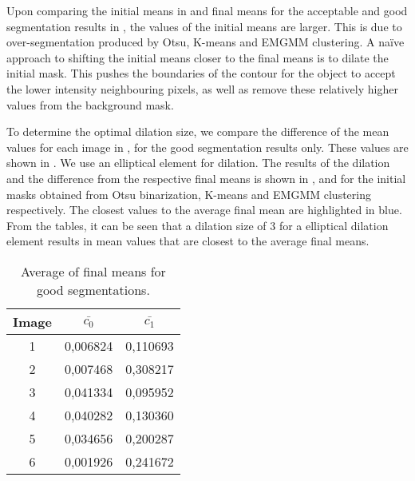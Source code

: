 Upon comparing the initial means in  and final means for the acceptable and good segmentation results in , the values of the initial means are larger. This is due to over-segmentation produced by Otsu, K-means and EMGMM clustering. A na{\"i}ve approach to shifting the initial means closer to the final means is to dilate the initial mask. This pushes the boundaries of the contour for the object to accept the lower intensity neighbouring pixels, as well as remove these relatively higher values from the background mask.

To determine the optimal dilation size, we compare the difference of the mean values for each image in , for the good segmentation results only. These values are shown in . We use an elliptical element for dilation. The results of the dilation and the difference from the respective final means is shown in ,  and  for the initial masks obtained from Otsu binarization, K-means and EMGMM clustering respectively. The closest values to the average final mean are highlighted in blue. From the tables, it can be seen that a dilation size of 3 for a elliptical dilation element results in mean values that are closest to the average final means.

\begin{table}[!h]
	\centering
	\caption{Average of final means for good segmentations.}
	\begin{tabular}{|c|c|c|}
		\hline 
		Image & $\bar{c_0}$ & $\bar{c_1}$ \\ 
		\hline 
		1 & 0,006824 & 0,110693 \\ 
		\hline 
		2 & 0,007468 & 0,308217 \\ 
		\hline 
		3 & 0,041334 & 0,095952 \\ 
		\hline 
		4 & 0,040282 & 0,130360 \\ 
		\hline 
		5 & 0,034656 & 0,200287 \\ 
		\hline 
		6 & 0,001926 & 0,241672 \\ 
		\hline 
	\end{tabular}
	\label{tab:meanofmeans}
\end{table}


